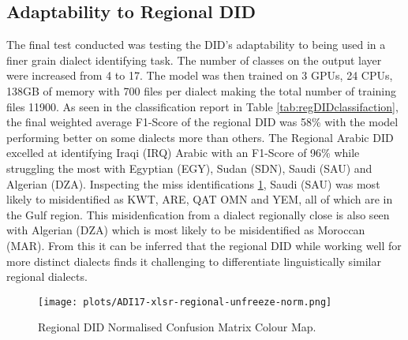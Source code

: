 \subsection{Adaptability to Regional DID}\label{sect:regDID}
The final test conducted was testing the DID's adaptability to being used in a finer grain dialect identifying task. The number of classes 
on the output layer were increased from 4 to 17. The model was then trained on 3 GPUs, 24 CPUs, 138GB of memory with 700 files per dialect making the total number of training files 11900. 
As seen in the classification report in Table \ref{tab:regDIDclassifaction}, the final weighted average F1-Score of the regional DID was 58\% with the model performing better on some 
dialects more than others. The Regional Arabic DID excelled at identifying Iraqi (IRQ) Arabic with an F1-Score of 96\% while struggling the most with Egyptian (EGY), Sudan (SDN), Saudi (SAU) and Algerian (DZA).
Inspecting the miss identifications \ref{fig:colourRegDID}, Saudi (SAU) was most likely to misidentified as KWT, ARE, QAT OMN and YEM, all of which are in the Gulf region. This misidenfication from a dialect regionally 
close is also seen with Algerian (DZA) which is most likely to be misidentified as Moroccan (MAR). From this it can be inferred that the regional DID while working well for more distinct dialects finds it 
challenging to differentiate linguistically similar regional dialects.  


\begin{figure}[h!]
    \centering
    \texttt{[image: plots/ADI17-xlsr-regional-unfreeze-norm.png]}
    \caption{Regional DID Normalised Confusion Matrix Colour Map.}
    \label{fig:colourRegDID}
\end{figure}

